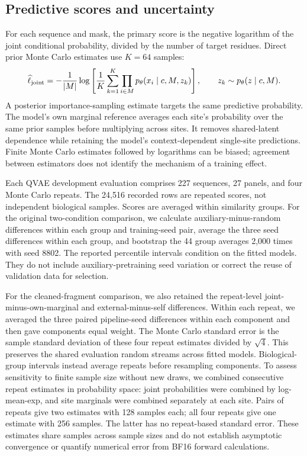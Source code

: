\documentclass[referee,pdflatex,sn-vancouver-num]{sn-jnl}
\begin{document}
\subsection{Predictive scores and uncertainty}
For each sequence and mask, the primary score is the negative logarithm of the joint conditional probability, divided by the number of target residues. Direct prior Monte Carlo estimates use $K=64$ samples:
\begin{equation}
 \widehat{\ell}_{\rm joint}=-\frac{1}{|M|}\log\left[
 \frac{1}{K}\sum_{k=1}^{K}\prod_{i\in M}
 p_\theta(x_i\mid c,M,z_k)\right],\qquad z_k\sim p_\theta(z\mid c,M).
\end{equation}
A posterior importance-sampling estimate targets the same predictive probability. The model's own marginal reference averages each site's probability over the same prior samples before multiplying across sites. It removes shared-latent dependence while retaining the model's context-dependent single-site predictions. Finite Monte Carlo estimates followed by logarithms can be biased; agreement between estimators does not identify the mechanism of a training effect.

Each QVAE development evaluation comprises 227 sequences, 27 panels, and four Monte Carlo repeats. The 24,516 recorded rows are repeated scores, not independent biological samples. Scores are averaged within similarity groups. For the original two-condition comparison, we calculate auxiliary-minus-random differences within each group and training-seed pair, average the three seed differences within each group, and bootstrap the 44 group averages 2,000 times with seed 8802. The reported percentile intervals condition on the fitted models. They do not include auxiliary-pretraining seed variation or correct the reuse of validation data for selection.

For the cleaned-fragment comparison, we also retained the repeat-level joint-minus-own-marginal and external-minus-self differences. Within each repeat, we averaged the three paired pipeline-seed differences within each component and then gave components equal weight. The Monte Carlo standard error is the sample standard deviation of these four repeat estimates divided by $\sqrt{4}$. This preserves the shared evaluation random streams across fitted models. Biological-group intervals instead average repeats before resampling components. To assess sensitivity to finite sample size without new draws, we combined consecutive repeat estimates in probability space: joint probabilities were combined by log-mean-exp, and site marginals were combined separately at each site. Pairs of repeats give two estimates with 128 samples each; all four repeats give one estimate with 256 samples. The latter has no repeat-based standard error. These estimates share samples across sample sizes and do not establish asymptotic convergence or quantify numerical error from BF16 forward calculations.
\end{document}
